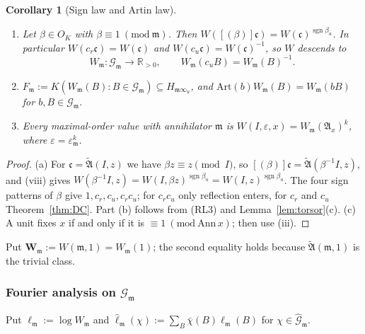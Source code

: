 \documentclass[11pt]{amsart}
\numberwithin{equation}{section}
\theoremstyle{plain}
\newtheorem{corollary}[theorem]{Corollary}
\theoremstyle{definition}
\theoremstyle{remark}
\begin{document}
\begin{corollary}[Sign law and Artin law]\label{cor:signartin}
\begin{enumerate}
\item[(a)] Let \(\beta\in O_K\) with \(\beta\equiv1\ (\mathrm{mod}\ \mathfrak m)\). Then \(W([(\beta)]\mathfrak c)=W(\mathfrak c)^{\operatorname{sgn}\beta_u}\). In particular \(W(c_r\mathfrak c)=W(\mathfrak c)\) and \(W(c_u\mathfrak c)=W(\mathfrak c)^{-1}\), so \(W\) descends to
\[W_{\mathfrak m}:\mathcal G_{\mathfrak m}\to\mathbb R_{>0},\qquad W_{\mathfrak m}(c_uB)=W_{\mathfrak m}(B)^{-1}.\]
\item[(b)] \(F_{\mathfrak m}:=K(W_{\mathfrak m}(B):B\in\mathcal G_{\mathfrak m})\subseteq H_{\mathfrak m\infty_u}\), and \(\mathrm{Art}(b)W_{\mathfrak m}(B)=W_{\mathfrak m}(bB)\) for \(b,B\in\mathcal G_{\mathfrak m}\).
\item[(c)] Every maximal-order value with annihilator \(\mathfrak m\) is \(W(I,\varepsilon,x)=W_{\mathfrak m}(\mathfrak A_x)^k\), where \(\varepsilon=\varepsilon_{\mathfrak m}^k\).
\end{enumerate}
\end{corollary}

\begin{proof}
(a) For \(\mathfrak c=\widetilde{\mathfrak A}(I,z)\) we have \(\beta z\equiv z\pmod I\), so \([(\beta)]\mathfrak c=\widetilde{\mathfrak A}(\beta^{-1}I,z)\), and (viii) gives \(W(\beta^{-1}I,z)=W(I,\beta z)^{\operatorname{sgn}\beta_u}=W(I,z)^{\operatorname{sgn}\beta_u}\). The four sign patterns of \(\beta\) give \(1,c_r,c_u,c_rc_u\); for \(c_rc_u\) only reflection enters, for \(c_r\) and \(c_u\) Theorem~\ref{thm:DC}. Part (b) follows from (RL3) and Lemma~\ref{lem:torsor}(c). (c) A unit fixes \(x\) if and only if it is \(\equiv1\ (\mathrm{mod}\ \mathrm{Ann}\,x)\); then use (iii).
\end{proof}

Put \(\mathbf W_{\mathfrak m}:=W(\mathfrak m,1)=W_{\mathfrak m}(1)\); the second equality holds because \(\widetilde{\mathfrak A}(\mathfrak m,1)\) is the trivial class.

\subsubsection*{Fourier analysis on \(\mathcal G_{\mathfrak m}\)}
Put \(\ell_{\mathfrak m}:=\log W_{\mathfrak m}\) and \(\hat\ell_{\mathfrak m}(\chi):=\sum_{B}\bar\chi(B)\ell_{\mathfrak m}(B)\) for \(\chi\in\widehat{\mathcal G}_{\mathfrak m}\).
\end{document}
